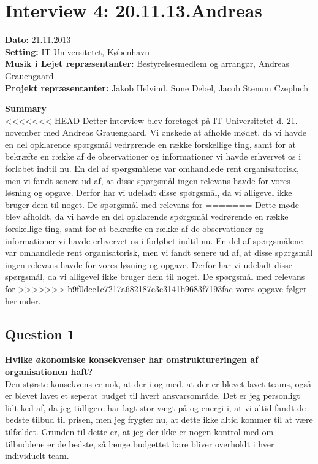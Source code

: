 \section{Interview 4: 20.11.13.Andreas}
\label{sec:interview_3}

\textbf{Dato:} 21.11.2013 \\
\textbf{Setting:} IT Universitetet, København \\
\textbf{Musik i Lejet repræsentanter:} Bestyrelsesmedlem og arrangør, Andreas Grauengaard  \\
\textbf{Projekt repræsentanter:} Jakob Helvind, Sune Debel, Jacob Stenum Czepluch

\bigskip

\noindent \textbf{Summary} \\
<<<<<<< HEAD
Detter interview blev foretaget på IT Universitetet d. 21. november med Andreas Grauengaard. Vi ønskede at afholde mødet, da vi havde en del opklarende spørgsmål vedrørende en række forskellige ting, samt for at bekræfte en række af de observationer og informationer vi havde erhvervet os i forløbet indtil nu. En del af spørgsmålene var omhandlede \mil rent organisatorisk, men vi fandt senere ud af, at disse spørgsmål ingen relevans havde for vores løsning og opgave. Derfor har vi udeladt disse spørgsmål, da vi alligevel ikke bruger dem til noget. De spørgsmål med relevans for
=======
Dette møde blev afholdt, da vi havde en del opklarende spørgsmål vedrørende en række forskellige
ting, samt for at bekræfte en række af de observationer og informationer vi havde erhvervet os i
forløbet indtil nu. En del af spørgsmålene var omhandlede \mil rent organisatorisk, men vi fandt
senere ud af, at disse spørgsmål ingen relevans havde for vores løsning og opgave. Derfor har vi
udeladt disse spørgsmål, da vi alligevel ikke bruger dem til noget. De spørgsmål med relevans for
>>>>>>> b9f0dce1c7217a682187c3e3141b9683f7193fac
vores opgave følger herunder.

\subsection{Question 1}
\label{i3q1}
\noindent \textbf{Hvilke økonomiske konsekvenser har omstruktureringen af organisationen haft?} 
\\
Den største konsekvens er nok, at der i og med, at der er blevet lavet teams, også er blevet lavet
et seperat budget til hvert ansvarsområde. Det er jeg personligt lidt ked af, da jeg tidligere har
lagt stor vægt på og energi i, at vi altid fandt de bedste tilbud til prisen, men jeg frygter nu, at
dette ikke altid kommer til at være tilfældet. Grunden til dette er, at jeg der ikke er nogen
kontrol med om tilbuddene er de bedste, så længe budgettet bare bliver overholdt i hver individuelt
team.

